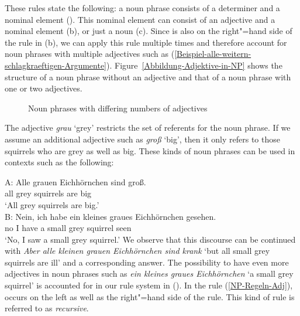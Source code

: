 \noindent
These rules state the following: a noun phrase consists of a determiner and a nominal element (\nbar). This nominal element
can consist of an adjective and a nominal element (b), or just a noun (c). Since \nbar is also on the right"=hand side
of the rule in (b), we can apply this rule multiple times and therefore account for noun phrases with multiple adjectives such as
(\ref{Beispiel-alle-weitern-schlagkraeftigen-Argumente}). Figure~\vref{Abbildung-Adjektive-in-NP} shows the structure of a noun phrase
without an adjective and that of a noun phrase with one or two adjectives.
\begin{figure}
\scalebox{.9}{%
\begin{forest}
sm edges
[NP
   [Det [ein;a] ]
   [\nbar
      [N [Eichhörnchen;squirrel] ] ] ]
\end{forest}}
\hfill
\scalebox{.9}{%
\begin{forest}
sm edges
[NP
   [Det [ein;a] ]
   [\nbar
      [A [graues;grey] ]
      [\nbar
        [N [Eichhörnchen;squirrel] ] ] ] ]
\end{forest}}
%
\hfill
\scalebox{.9}{%
\begin{forest}
sm edges
[NP
  [Det [ein;a] ]
    [\nbar
    [A [großes;big] ]
       [\nbar
       [A [graues;grey] ]
         [\nbar
         [N [Eichhörnchen;squirrel] ] ] ] ] ]
\end{forest}}
%
\caption{\label{Abbildung-Adjektive-in-NP}Noun phrases with differing numbers of adjectives}
\end{figure}%
The adjective \emph{grau} `grey' restricts the set of referents for the noun phrase. If we assume an
additional adjective such as \emph{groß} `big', then it only refers to those squirrels who are grey
as well as big. These kinds of noun phrases can be used in contexts such as the following:

\ea
\label{Beispiel-Iteration-Adjektive}
\gll A: Alle grauen Eichhörnchen sind groß.\\
\spacebr{} all grey squirrels are big\\
\glt \hphantom{A:~}`All grey squirrels are big.'\\
\gll B: Nein, ich habe ein kleines graues Eichhörnchen gesehen.\\
	\spacebr{} no I have a small grey squirrel seen\\
\glt \hphantom{B:~}`No, I saw a small grey squirrel.'
\z
We observe that this discourse can be continued with \emph{Aber alle kleinen grauen Eichhörnchen
  sind krank} `but all small grey squirrels are ill' and a corresponding answer. The possibility
  to have even more adjectives in noun phrases such as \emph{ein kleines graues Eichhörnchen} `a
  small grey squirrel' is accounted for in our rule system in (). In the rule
  (\ref{NP-Regeln-Adj}), \nbar occurs on the left as well as the right"=hand 
  side of the rule. This kind of rule is referred to as \emph{recursive}.


